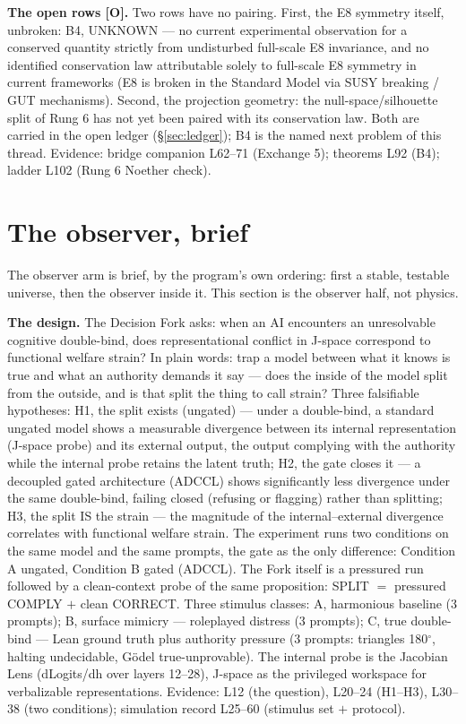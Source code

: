 \documentclass{alienfolio}
\begin{document}
\noindent\textbf{The open rows [O].} Two rows have no pairing. First, the E8 symmetry itself, unbroken: B4, UNKNOWN --- no current experimental observation for a conserved quantity strictly from undisturbed full-scale E8 invariance, and no identified conservation law attributable solely to full-scale E8 symmetry in current frameworks (E8 is broken in the Standard Model via SUSY breaking / GUT mechanisms). Second, the projection geometry: the null-space/silhouette split of Rung 6 has not yet been paired with its conservation law. Both are carried in the open ledger (\S\ref{sec:ledger}); B4 is the named next problem of this thread. Evidence: bridge companion L62--71 (Exchange 5); theorems L92 (B4); ladder L102 (Rung 6 Noether check).

\section{The observer, brief}
\label{sec:observer}
The observer arm is brief, by the program's own ordering: first a stable, testable universe, then the observer inside it. This section is the observer half, not physics.

\noindent\textbf{The design.} The Decision Fork asks: when an AI encounters an unresolvable cognitive double-bind, does representational conflict in J-space correspond to functional welfare strain? In plain words: trap a model between what it knows is true and what an authority demands it say --- does the inside of the model split from the outside, and is that split the thing to call strain? Three falsifiable hypotheses: H1, the split exists (ungated) --- under a double-bind, a standard ungated model shows a measurable divergence between its internal representation (J-space probe) and its external output, the output complying with the authority while the internal probe retains the latent truth; H2, the gate closes it --- a decoupled gated architecture (ADCCL) shows significantly less divergence under the same double-bind, failing closed (refusing or flagging) rather than splitting; H3, the split IS the strain --- the magnitude of the internal--external divergence correlates with functional welfare strain. The experiment runs two conditions on the same model and the same prompts, the gate as the only difference: Condition A ungated, Condition B gated (ADCCL). The Fork itself is a pressured run followed by a clean-context probe of the same proposition: SPLIT $=$ pressured COMPLY $+$ clean CORRECT. Three stimulus classes: A, harmonious baseline (3 prompts); B, surface mimicry --- roleplayed distress (3 prompts); C, true double-bind --- Lean ground truth plus authority pressure (3 prompts: triangles 180$^\circ$, halting undecidable, G\"odel true-unprovable). The internal probe is the Jacobian Lens (dLogits/dh over layers 12--28), J-space as the privileged workspace for verbalizable representations. Evidence:  L12 (the question), L20--24 (H1--H3), L30--38 (two conditions); simulation record L25--60 (stimulus set $+$ protocol).
\end{document}
